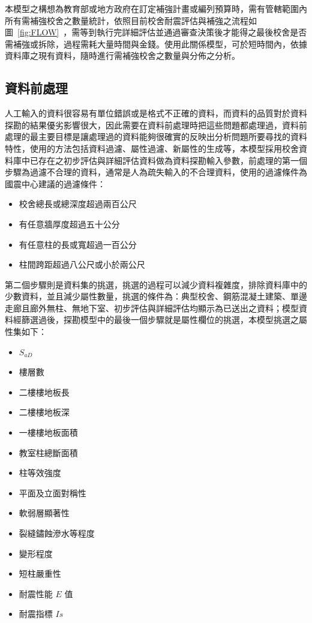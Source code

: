 本模型之構想為教育部或地方政府在訂定補強計畫或編列預算時，需有管轄範圍內所有需補強校舍之數量統計，依照目前校舍耐震評估與補強之流程如圖~\ref{fig:FLOW}~，需等到執行完詳細評估並通過審查決策後才能得之最後校舍是否需補強或拆除，過程需耗大量時間與金錢。使用此關係模型，可於短時間內，依據資料庫之現有資料，隨時進行需補強校舍之數量與分佈之分析。

\subsection{資料前處理}

人工輸入的資料很容易有單位錯誤或是格式不正確的資料，而資料的品質對於資料探勘的結果優劣影響很大，因此需要在資料前處理時把這些問題都處理過，資料前處理的最主要目標是讓處理過的資料能夠很確實的反映出分析問題所要尋找的資料特性，使用的方法包括資料過濾、屬性過濾、新屬性的生成等，本模型採用校舍資料庫中已存在之初步評估與詳細評估資料做為資料探勘輸入參數，前處理的第一個步驟為過濾不合理的資料，通常是人為疏失輸入的不合理資料，使用的過濾條件為國震中心建議的過濾條件：

\begin{itemize}
\item 校舍總長或總深度超過兩百公尺
\item 有任意牆厚度超過五十公分
\item 有任意柱的長或寬超過一百公分
\item 柱間跨距超過八公尺或小於兩公尺
\end{itemize}

第二個步驟則是資料集的挑選，挑選的過程可以減少資料複雜度，排除資料庫中的少數資料，並且減少屬性數量，挑選的條件為：典型校舍、鋼筋混凝土建築、單邊走廊且廊外無柱、無地下室、初步評估與詳細評估均顯示為已送出之資料；模型資料經篩選過後，探勘模型中的最後一個步驟就是屬性欄位的挑選，本模型挑選之屬性集如下：


\begin{multicols}{2}
\begin{itemize}
\item $S_{aD}$
\item 樓層數
\item 二樓樓地板長
\item 二樓樓地板深
\item 一樓樓地板面積
\item 教室柱總斷面積
\item 柱等效強度
\item 平面及立面對稱性
\item 軟弱層顯著性
\item 裂縫鏽蝕滲水等程度
\item 變形程度
\item 短柱嚴重性
\item 耐震性能 $E$ 值
\item 耐震指標 $Is$
\end{itemize}
\end{multicols}


